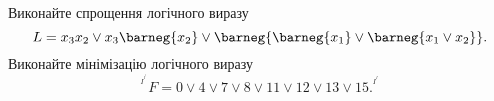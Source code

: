 %
%
^^I^^IВиконайте спрощення логічного виразу
^^I^^I\[
^^I^^I^^IL = x_3x_2 \lor x_3 \barneg{x_2} \lor \barneg{\barneg{x_1} \lor \barneg{x_1 \lor x_2} }.
^^I^^I\]
^^I^^IВиконайте мінімізацію логічного виразу
^^I^^I\[
^^I^^I^^IF = 0 \lor 4 \lor 7 \lor 8 \lor 11 \lor 12 \lor 13 \lor 15.
^^I^^I\]
